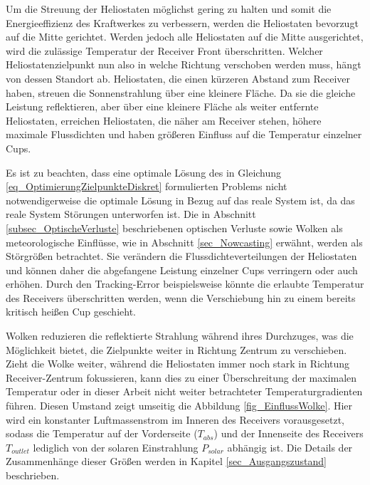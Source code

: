 Um die Streuung der Heliostaten möglichst gering zu halten und somit die Energieeffizienz des Kraftwerkes zu verbessern, werden die Heliostaten bevorzugt auf die Mitte gerichtet.
Werden jedoch alle Heliostaten auf die Mitte ausgerichtet, wird die zulässige Temperatur der Receiver Front überschritten.
Welcher Heliostatenzielpunkt nun also in welche Richtung verschoben werden muss, hängt von dessen Standort ab.
Heliostaten, die einen kürzeren Abstand zum Receiver haben, streuen die Sonnenstrahlung über eine kleinere Fläche.
Da sie die gleiche Leistung reflektieren, aber über eine kleinere Fläche als weiter entfernte Heliostaten, erreichen Heliostaten, die näher am Receiver stehen, höhere maximale Flussdichten und haben größeren Einfluss auf die Temperatur einzelner Cups.

Es ist zu beachten, dass eine optimale Lösung des in Gleichung \ref{eq_OptimierungZielpunkteDiskret} formulierten Problems nicht notwendigerweise die optimale Lösung in Bezug auf das reale System ist, da das reale System Störungen unterworfen ist.
Die in Abschnitt \ref{subsec_OptischeVerluste} beschriebenen optischen Verluste sowie Wolken als meteorologische Einflüsse, wie in Abschnitt \ref{sec_Nowcasting} erwähnt, werden als Störgrößen betrachtet.
Sie verändern die Flussdichteverteilungen der Heliostaten und können daher die abgefangene Leistung einzelner Cups verringern oder auch erhöhen.
Durch den Tracking-Error beispielsweise könnte die erlaubte Temperatur des Receivers überschritten werden, wenn die Verschiebung hin zu einem bereits kritisch heißen Cup geschieht. \cite[S.16]{DissZanger}

Wolken reduzieren die reflektierte Strahlung während ihres Durchzuges, was die Möglichkeit bietet, die Zielpunkte weiter in Richtung Zentrum zu verschieben.
Zieht die Wolke weiter, während die Heliostaten immer noch stark in Richtung Receiver-Zentrum fokussieren, kann dies zu einer Überschreitung der maximalen Temperatur oder in dieser Arbeit nicht weiter betrachteter Temperaturgradienten führen.
Diesen Umstand zeigt umseitig die Abbildung \ref{fig_EinflussWolke}.
Hier wird ein konstanter Luftmassenstrom im Inneren des Receivers vorausgesetzt, sodass die Temperatur auf der Vorderseite ($T_{abs}$) und der Innenseite des Receivers $T_{outlet}$ lediglich von der solaren Einstrahlung $P_{solar}$ abhängig ist.
Die Details der Zusammenhänge dieser Größen werden in Kapitel \ref{sec_Ausgangszustand} beschrieben.

